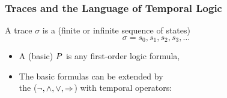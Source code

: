 \begin{frame}
  \frametitle{Traces and the Language of Temporal Logic}

  \begin{alertblock}{}
    A trace $\sigma$ is a (finite or infinite sequence of states)
    \[\sigma = s_0, s_1, s_2, s_3, \ldots\]
  \end{alertblock}

  \begin{itemize}
  \item A (basic)  $P$ is any
    \alert{first-order logic formula},
    \medskip
  \item The basic formulas can be extended by  \\
    \quad the  ($\neg, \land, \lor, \mathbin\Rightarrow$) with
    \alert{temporal operators}:
    \medskip
    \begin{center}
      
    \end{center}
    \begin{center}
      
    \end{center}
  \end{itemize}
\end{frame}




\newcommand{\iI}{I}
\newcommand{\predP}{P}
\newcommand{\predQ}{Q}
\newcommand{\predR}{R}




